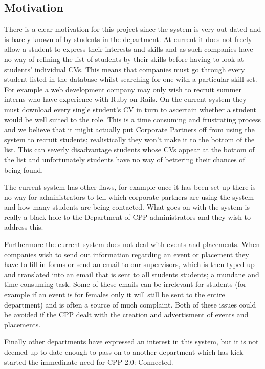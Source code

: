 \subsection{Motivation}
  There is a clear motivation for this project since the system is very out dated and is barely known of by students in the department.
  At current it does not freely allow a student to express their interests and skills and as such companies have no way of refining the list of students by their skills before having to look at students' individual CVs. This means that companies must go through every student listed in the database whilst searching for one with a particular skill set. For example a web development company may only wish to recruit summer interns who have experience with Ruby on Rails. On the current system they must download every single student's CV in turn to ascertain whether a student would be well suited to the role. This is a time consuming and frustrating process and we believe that it might actually put Corporate Partners off from using the system to recruit students; realistically they won't make it to the bottom of the list.
  This can severly disadvantage students whose CVs appear at the bottom of the list and unfortunately students have
  no way of bettering their chances of being found.

  The current system has other flaws, for example once it has been set up there is no way for administrators to tell which corporate partners are using the system and how many students are being contacted. What goes on with the system is really a black hole to the Department of CPP administrators and they wish to address this. 

  Furthermore the current system does not deal with events and placements. When companies wish to send out information regarding an event or placement they have to fill in forms or send an email to our supervisors, which is then typed up and translated into an email that is sent to all students students; a mundane and time consuming task. Some of these emails can be irrelevant for students (for example if an event is for females only it will still be sent to the entire department) and is often a source of much complaint. 
  Both of these issues could be avoided if the CPP dealt with the creation and advertisment of events and placements.

  Finally other departments have expressed an interest in this system, but it is not deemed up to date enough to pass on to another department which has kick started the immedinate need for CPP 2.0: Connected.